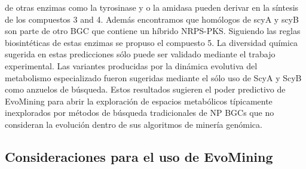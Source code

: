 \documentclass[12pt,twoside]{reedthesis}
\begin{document}
  de otras enzimas como la tyrosinase y o la amidasa pueden derivar en la
  síntesis de los compuestos 3 and 4. Además encontramos que homólogos de
  scyA y scyB son parte de otro BGC que contiene un híbrido NRPS-PKS.
  Siguiendo las reglas biosintéticas de estas enzimas se propuso el
  compuesto 5. La diversidad química sugerida en estas predicciones sólo
  puede ser validado mediante el trabajo experimental. Las variantes
  producidas por la dinámica evolutiva del metabolismo especializado
  fueron sugeridas mediante el sólo uso de ScyA y ScyB como anzuelos de
  búsqueda. Estos resultados sugieren el poder predictivo de EvoMining
  para abrir la exploración de espacios metabólicos típicamente
  inexplorados por métodos de búsqueda tradicionales de NP BGCs que no
  consideran la evolución dentro de sus algoritmos de minería genómica.
  
  \subsection{Consideraciones para el uso de
  EvoMining}\label{consideraciones-para-el-uso-de-evomining}
  
\end{document}
